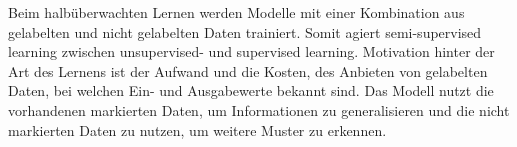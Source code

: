 Beim halbüberwachten Lernen werden Modelle mit einer Kombination aus gelabelten
und nicht gelabelten Daten trainiert. Somit agiert semi-supervised learning
zwischen unsupervised- und supervised learning. Motivation hinter der Art des
Lernens ist der Aufwand und die Kosten, des Anbieten von gelabelten Daten, bei
welchen Ein- und Ausgabewerte bekannt sind. \cite{lanquillon2019grundzuge} Das Modell nutzt die vorhandenen
markierten Daten, um Informationen zu generalisieren und die nicht markierten
Daten zu nutzen, um weitere Muster zu erkennen.